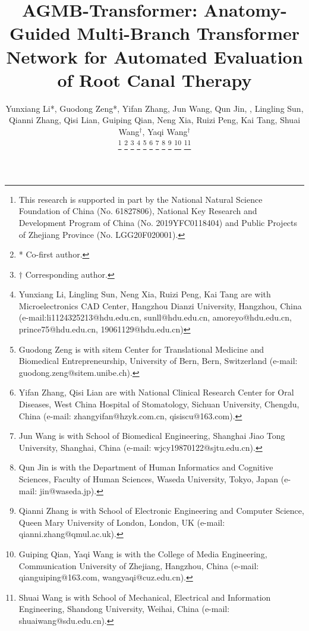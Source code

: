 \documentclass[journal]{IEEEtran}
\begin{document}
\title{AGMB-Transformer: Anatomy-Guided Multi-Branch Transformer Network for Automated Evaluation of Root Canal Therapy}
\author{Yunxiang Li*, Guodong Zeng*, Yifan Zhang, Jun Wang, Qun Jin, , Lingling Sun, Qianni Zhang, Qisi Lian, Guiping Qian, Neng Xia, Ruizi Peng, Kai Tang, Shuai Wang$^{\dagger}$, Yaqi Wang$^{\dagger}$

\thanks{This research is supported in part by the National Natural Science Foundation of China (No. 61827806), National Key Research and Development Program of China (No. 2019YFC0118404) and Public Projects of Zhejiang Province (No. LGG20F020001).}
\thanks{* Co-first author. }
\thanks{$\dagger$ Corresponding author.}
\thanks{Yunxiang Li, Lingling Sun, Neng Xia, Ruizi Peng, Kai Tang are with Microelectronics CAD Center, Hangzhou Dianzi University, Hangzhou, China (e-mail:li1124325213@hdu.edu.cn, sunll@hdu.edu.cn, amoreyo@hdu.edu.cn, prince75@hdu.edu.cn, 19061129@hdu.edu.cn) }
\thanks{Guodong Zeng is with sitem Center for Translational Medicine and Biomedical Entrepreneurship, University of Bern, Bern, Switzerland (e-mail: guodong.zeng@sitem.unibe.ch).}
\thanks{Yifan Zhang, Qisi Lian are with National Clinical Research Center for Oral Diseases, West China Hospital of Stomatology, Sichuan University, Chengdu, China (e-mail: zhangyifan@hzyk.com.cn, qisiscu@163.com).}
\thanks{Jun Wang is with School of Biomedical Engineering, Shanghai Jiao Tong University, Shanghai, China (e-mail: wjcy19870122@sjtu.edu.cn).}
\thanks{Qun Jin is with the Department of Human Informatics and Cognitive Sciences, Faculty of Human Sciences, Waseda University, Tokyo, Japan (e-mail: jin@waseda.jp).}
\thanks{Qianni Zhang is with School of Electronic Engineering and Computer Science, Queen Mary University of London, London, UK (e-mail: qianni.zhang@qmul.ac.uk).}
\thanks{Guiping Qian, Yaqi Wang is with the College of Media Engineering, Communication University of Zhejiang, Hangzhou, China (e-mail: qianguiping@163.com, wangyaqi@cuz.edu.cn).}
\thanks{Shuai Wang is with School of Mechanical, Electrical and Information Engineering, Shandong University, Weihai, China (e-mail: shuaiwang@sdu.edu.cn).}
}
\end{document}
